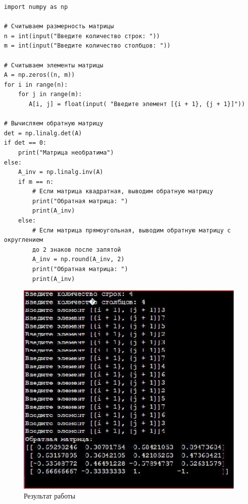 \documentclass[12pt,a4paper]{scrartcl}
\begin{document}
\begin{verbatim}
import numpy as np

# Считываем размерность матрицы
n = int(input("Введите количество строк: "))
m = int(input("Введите количество столбцов: "))

# Считываем элементы матрицы
A = np.zeros((n, m))
for i in range(n):
    for j in range(m):
       A[i, j] = float(input( "Введите элемент [{i + 1}, {j + 1}]"))

# Вычисляем обратную матрицу
det = np.linalg.det(A)
if det == 0:
    print("Матрица необратима")
else:
    A_inv = np.linalg.inv(A)
    if m == n:
        # Если матрица квадратная, выводим обратную матрицу
        print("Обратная матрица: ")
        print(A_inv)
    else:
        # Если матрица прямоугольная, выводим обратную матрицу с округлением 
        до 2 знаков после запятой
        A_inv = np.round(A_inv, 2)
        print("Обратная матрица: ")
        print(A_inv)
\end{verbatim}

\begin{figure}[h]
 \centering
 \includegraphics[width=1\textwidth]{photo1686082293.jpeg}
 \caption{Результат работы}\label{fig:par}
\end{figure}
\end{document}
